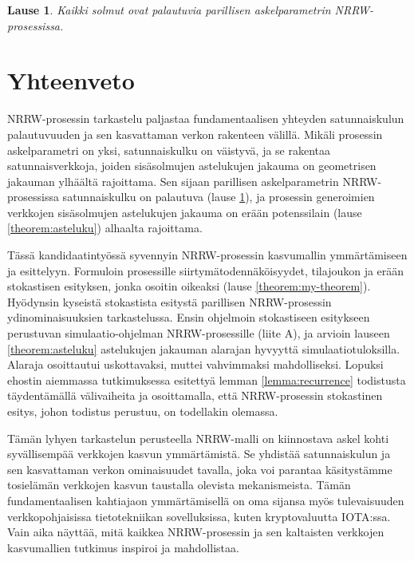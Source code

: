 \documentclass[finnish, 12pt, a4paper, sci, utf8, pdfa]{aaltothesis}
\newtheorem{theorem}{Lause}
\begin{document}
\begin{theorem}
Kaikki solmut ovat palautuvia parillisen askelparametrin NRRW-prosessissa. 
   \label{theorem:actual-recurrence}
\end{theorem}

\section{Yhteenveto}

NRRW-prosessin tarkastelu paljastaa fundamentaalisen yhteyden satunnaiskulun palautuvuuden ja sen kasvattaman verkon rakenteen välillä. Mikäli prosessin askelparametri on yksi,
satunnaiskulku on väistyvä, ja se rakentaa satunnaisverkkoja, joiden sisäsolmujen astelukujen jakauma on geometrisen jakauman ylhäältä rajoittama. Sen sijaan parillisen askelparametrin
NRRW-prosessissa satunnaiskulku on palautuva (lause \ref{theorem:actual-recurrence}), ja prosessin generoimien verkkojen sisäsolmujen astelukujen jakauma on erään potenssilain 
(lause \ref{theorem:asteluku}) alhaalta rajoittama. 

Tässä kandidaatintyössä syvennyin NRRW-prosessin kasvumallin ymmärtämiseen ja esittelyyn. Formuloin prosessille siirtymätodennäköisyydet, tilajoukon ja erään stokastisen esityksen,
jonka osoitin oikeaksi (lause \ref{theorem:my-theorem}). Hyödynsin kyseistä stokastista esitystä parillisen NRRW-prosessin ydinominaisuuksien tarkastelussa. Ensin ohjelmoin stokastiseen
esitykseen perustuvan simulaatio-ohjelman NRRW-prosessille (liite A), ja arvioin lauseen \ref{theorem:asteluku} astelukujen jakauman alarajan hyvyyttä simulaatiotuloksilla. Alaraja osoittautui
uskottavaksi, muttei vahvimmaksi mahdolliseksi. Lopuksi ehostin aiemmassa tutkimuksessa esitettyä lemman \ref{lemma:recurrence} todistusta täydentämällä välivaiheita ja osoittamalla, että NRRW-prosessin stokastinen esitys, johon todistus perustuu, on todellakin olemassa.

Tämän lyhyen tarkastelun perusteella NRRW-malli on kiinnostava askel kohti syvällisempää verkkojen kasvun ymmärtämistä. Se yhdistää satunnaiskulun ja sen kasvattaman verkon ominaisuudet
tavalla, joka voi parantaa käsitystämme tosielämän verkkojen kasvun taustalla olevista mekanismeista. Tämän fundamentaalisen kahtiajaon ymmärtämisellä on oma sijansa myös tulevaisuuden
verkkopohjaisissa tietotekniikan sovelluksissa, kuten kryptovaluutta IOTA:ssa. Vain aika näyttää, mitä kaikkea NRRW-prosessin ja sen kaltaisten verkkojen kasvumallien tutkimus inspiroi
ja mahdollistaa.
\end{document}
